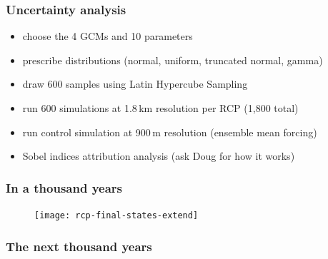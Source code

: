 \documentclass[hide notes,intlimits]{beamer}
\begin{document}
\begin{frame}
  \frametitle{Uncertainty analysis}
  \begin{itemize}
  \item choose the 4 GCMs and 10 parameters
  \item prescribe distributions (normal, uniform, truncated normal, gamma)
  \item draw 600 samples using Latin Hypercube Sampling
  \item run 600 simulations at 1.8\,km resolution per RCP (1,800 total)
  \item run control simulation at 900\,m resolution (ensemble mean forcing)
  \item Sobel indices attribution analysis (ask Doug for how it works)
  \end{itemize}
\end{frame}


\begin{frame}
  \frametitle{In a thousand years}
  \begin{figure}
    \texttt{[image: rcp-final-states-extend]}
  \end{figure}

\end{frame}

\begin{frame}
  \frametitle{The next thousand years}
  \begin{figure}
  \end{figure}
\end{frame}
\end{document}
